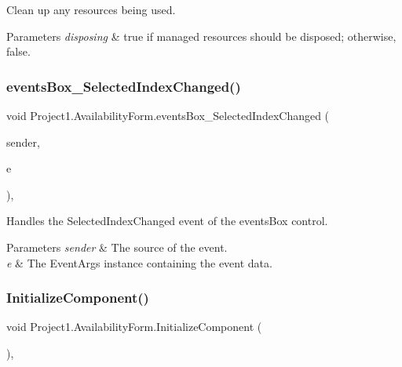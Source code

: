 Clean up any resources being used. 


\begin{DoxyParams}{Parameters}
{\em disposing} & true if managed resources should be disposed; otherwise, false.\\
\hline
\end{DoxyParams}
\mbox{\label{classProject1_1_1AvailabilityForm_a1ad0da6ac770635494b441c775a4f0d5}} 
\subsubsection{\texorpdfstring{events\+Box\+\_\+\+Selected\+Index\+Changed()}{eventsBox\_SelectedIndexChanged()}}
{\footnotesize\ttfamily void Project1.\+Availability\+Form.\+events\+Box\+\_\+\+Selected\+Index\+Changed (\begin{DoxyParamCaption}\item[{object}]{sender,  }\item[{Event\+Args}]{e }\end{DoxyParamCaption})\hspace{0.3cm}{\ttfamily [inline]}, {\ttfamily [private]}}



Handles the Selected\+Index\+Changed event of the events\+Box control. 


\begin{DoxyParams}{Parameters}
{\em sender} & The source of the event.\\
\hline
{\em e} & The Event\+Args instance containing the event data.\\
\hline
\end{DoxyParams}
\mbox{\label{classProject1_1_1AvailabilityForm_af75b44f7bbfe72fcfbe25b41504eb52d}} 
\subsubsection{\texorpdfstring{Initialize\+Component()}{InitializeComponent()}}
{\footnotesize\ttfamily void Project1.\+Availability\+Form.\+Initialize\+Component (\begin{DoxyParamCaption}{ }\end{DoxyParamCaption})\hspace{0.3cm}{\ttfamily [inline]}, {\ttfamily [private]}}



